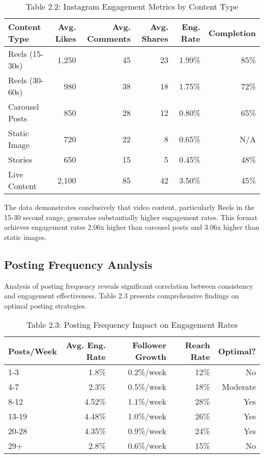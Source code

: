 \documentclass[12pt]{report}
\begin{document}
\begin{table}[h]
\centering
\caption{Table 2.2: Instagram Engagement Metrics by Content Type}
\begin{tabular}{@{}lrrrrr@{}}
\toprule
\textbf{Content Type} & \textbf{Avg. Likes} & \textbf{Avg. Comments} & \textbf{Avg. Shares} & \textbf{Eng. Rate} & \textbf{Completion} \\
\midrule
Reels (15-30s) & 1,250 & 45 & 23 & 1.99\% & 85\% \\
Reels (30-60s) & 980 & 38 & 18 & 1.75\% & 72\% \\
Carousel Posts & 850 & 28 & 12 & 0.80\% & 65\% \\
Static Image & 720 & 22 & 8 & 0.65\% & N/A \\
Stories & 650 & 15 & 5 & 0.45\% & 48\% \\
Live Content & 2,100 & 85 & 42 & 3.50\% & 45\% \\
\bottomrule
\end{tabular}
\end{table}

The data demonstrates conclusively that video content, particularly Reels in the 15-30 second range, generates substantially higher engagement rates. This format achieves engagement rates 2.06x higher than carousel posts and 3.06x higher than static images.

\subsection{Posting Frequency Analysis}

Analysis of posting frequency reveals significant correlation between consistency and engagement effectiveness. Table 2.3 presents comprehensive findings on optimal posting strategies.

\begin{table}[h]
\centering
\caption{Table 2.3: Posting Frequency Impact on Engagement Rates}
\begin{tabular}{@{}lrrrr@{}}
\toprule
\textbf{Posts/Week} & \textbf{Avg. Eng. Rate} & \textbf{Follower Growth} & \textbf{Reach Rate} & \textbf{Optimal?} \\
\midrule
1-3 & 1.8\% & 0.2\%/week & 12\% & No \\
4-7 & 2.3\% & 0.5\%/week & 18\% & Moderate \\
8-12 & 4.52\% & 1.1\%/week & 28\% & Yes \\
13-19 & 4.48\% & 1.0\%/week & 26\% & Yes \\
20-28 & 4.35\% & 0.9\%/week & 24\% & Yes \\
29+ & 2.8\% & 0.6\%/week & 15\% & No \\
\bottomrule
\end{tabular}
\end{table}
\end{document}
